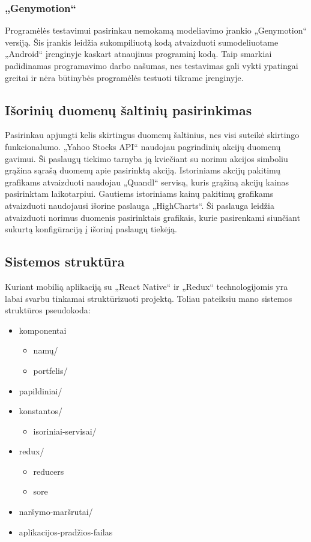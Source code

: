 \documentclass[a4paper,12pt,fleqn]{article}
\begin{document}
\subsubsection{„Genymotion“}
Programėlės testavimui pasirinkau nemokamą modeliavimo įrankio „Genymotion“ versiją. Šis įrankis leidžia sukompiliuotą kodą atvaizduoti sumodeliuotame „Android“ įrenginyje kaskart atnaujinus programinį kodą. Taip smarkiai padidinamas programavimo darbo našumas, nes testavimas gali vykti ypatingai greitai ir nėra būtinybės programėlės testuoti tikrame įrenginyje.
\subsection{Išorinių duomenų šaltinių pasirinkimas}
Pasirinkau apjungti kelis skirtingus duomenų šaltinius, nes visi suteikė skirtingo funkcionalumo. „Yahoo Stocks API“ naudojau pagrindinių akcijų duomenų gavimui. Ši paslaugų tiekimo tarnyba ją kviečiant su norimu akcijos simboliu grąžina sąrašą duomenų apie pasirinktą akciją. Istoriniams akcijų pakitimų grafikams atvaizduoti naudojau „Quandl“ servisą, kuris grąžiną akcijų kainas pasirinktam laikotarpiui. Gautiems istoriniams kainų pakitimų grafikams atvaizduoti naudojausi išorine paslauga „HighCharts“. Ši paslauga leidžia atvaizduoti norimus duomenis pasirinktais grafikais, kurie pasirenkami siunčiant sukurtą konfigūraciją į išorinį paslaugų tiekėją.
\subsection{Sistemos struktūra}
Kuriant mobilią aplikaciją su „React Native“ ir „Redux“ technologijomis yra labai svarbu tinkamai struktūrizuoti projektą. Toliau pateiksiu mano sistemos struktūros pseudokoda:
\begin{itemize}[noitemsep]
\item komponentai
	\begin{itemize}[noitemsep]
		\item namų/
		\item portfelis/
	\end{itemize}
\item papildiniai/
\item konstantos/
	\begin{itemize}[noitemsep]
		\item isoriniai-servisai/
	\end{itemize}
\item redux/
	\begin{itemize}[noitemsep]
		\item reducers
		\item sore
	\end{itemize}
\item naršymo-maršrutai/
\item aplikacijos-pradžios-failas
\end{itemize}
\end{document}

